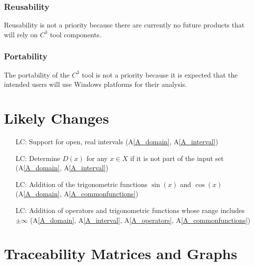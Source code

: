 \documentclass[12pt]{article}
\newcommand{\aref}[1]{A\ref{#1}}
\newcounter{lcnum} %
\newcommand{\prognameAbbrv}{$C^{3}$}
\begin{document}
\subsubsection*{Reusability}
Reusability is not a priority because there are currently no future products 
that will rely on \prognameAbbrv{} tool components.

\subsubsection*{Portability}
The portability of the \prognameAbbrv{} tool is not a priority because it is 
expected that the intended users will use Windows platforms for their analysis.

\section{Likely Changes}    
\label{changes}

\noindent \begin{itemize}

\item[LC\refstepcounter{lcnum}\thelcnum\label{LC_openinterval}:] Support for 
open, real intervals (\aref{A_domain}, \aref{A_interval})

\item[LC\refstepcounter{lcnum}\thelcnum\label{LC_unknownDomain}:] Determine 
$D(x)$ for any $x \in X$ if it is not part of the input set (\aref{A_domain}, 
\aref{A_interval})

\item[LC\refstepcounter{lcnum}\thelcnum\label{LC_trig}:] Addition of the 
trigonometric functions $\sin(x)$ and $\cos(x)$ (\aref{A_domain}, 
\aref{A_commonfunctions})

\item[LC\refstepcounter{lcnum}\thelcnum\label{LC_infinity}:] Addition of 
operators and trigonometric functions whose range includes $\pm\infty$ 
(\aref{A_domain}, \aref{A_interval}, \aref{A_operators}, 
\aref{A_commonfunctions})

\end{itemize}

\section{Traceability Matrices and Graphs}
\label{trace}
\end{document}
